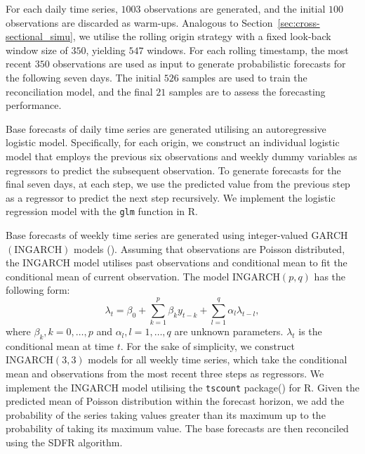 \documentclass[a4paper,review,12pt,authoryear]{elsarticle}
\let\code=\texttt
\let\proglang=\textsf
\theoremstyle{definition}
\begin{document}
     For each daily time series, $1003$ observations are generated, and the initial $100$ observations are discarded as warm-ups. Analogous to Section~\ref{sec:cross-sectional_simu}, we utilise the rolling origin strategy with a fixed look-back window size of $350$, yielding $547$ windows.
     For each rolling timestamp, the most recent $350$ observations are used as input to generate probabilistic forecasts for the following seven days.
     The initial $526$ samples are used to train the reconciliation model, and the final $21$ samples are to assess the forecasting performance.

     Base forecasts of daily time series are generated utilising an autoregressive logistic model.
     Specifically, for each origin, we construct an individual logistic model that employs the previous six observations and weekly dummy variables as regressors to predict the subsequent observation.
     To generate forecasts for the final seven days, at each step, we use the predicted value from the previous step as a regressor to predict the next step recursively.
     We implement the logistic regression model with the \code{glm} function in \proglang{R}.

     Base forecasts of weekly time series are generated using integer-valued GARCH $(\textrm{INGARCH})$ models ().
     Assuming that observations are Poisson distributed, the $\textrm{INGARCH}$ model utilises past observations and conditional mean to fit the conditional mean of current observation. The model $\textrm{INGARCH}(p, q)$ has the following form:
     \[
      \lambda_t = \beta_0 + \sum_{k=1}^p \beta_ky_{t-k} + \sum_{l=1}^q \alpha_l\lambda_{t-l}, 
     \] where $\beta_k, k=0,\dots,p$ and $\alpha_l, l=1,\dots,q$ are unknown parameters. $\lambda_t$ is the conditional mean at time $t$.
     For the sake of simplicity, we construct $\textrm{INGARCH}(3, 3)$ models for all weekly time series, which take the conditional mean and observations from the most recent three steps as regressors.
     We implement the $\textrm{INGARCH}$ model utilising the \code{tscount} package() for \proglang{R}.
     Given the predicted mean of Poisson distribution within the forecast horizon, we add the probability of the series taking values greater than its maximum up to the probability of taking its maximum value.
     The base forecasts are then reconciled using the \textrm{SDFR} algorithm.
\end{document}
